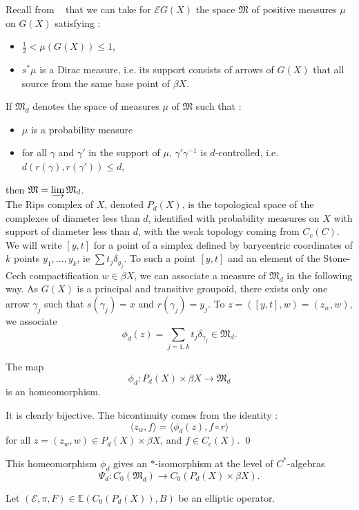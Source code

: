 Recall from ~\cite{TuNovikov} that we can take for $\mathcal E G(X) $ the space $\mathfrak M$ of positive measures $\mu$ on $G(X)$ satisfying :
\begin{itemize}
\item $\frac{1}{2}<\mu(G(X))\leq 1$, 
\item $s^*\mu$ is a Dirac measure, i.e. its support consists of arrows of $G(X)$ that all source from the same base point of $\beta X$.\\
\end{itemize}

If $\mathfrak M_d$ denotes the space of measures $\mu$ of $\mathfrak M$ such that :
\begin{itemize}
\item $\mu$ is a probability measure
\item for all $\gamma$ and $\gamma'$ in the support of $\mu$, $\gamma'\gamma^{-1}$ is $d$-controlled, i.e. $d(r(\gamma),r(\gamma'))\leq d$, 
\end{itemize}
then $\mathfrak M=\varinjlim \mathfrak M_d$.\\ %

The Rips complex of $X$, denoted $P_d(X)$, is the topological space of the complexes of diameter less than $d$, identified with probability measures on $X$ with support of diameter less than $d$, with the weak topology coming from $C_c(C)$. We will write $[y,t]$ for a point of a simplex defined by barycentric coordinates of $k$ points $y_1,...,y_k$, ie $\sum t_j \delta_{y_j}$. To such a point $[y,t]$ and an element of the Stone-Cech compactification $w\in \beta X$, we can associate a measure of $\mathfrak M_d$ in the following way. As $G(X)$ is a principal and transitive groupoid, there exists only one arrow $\gamma_j$ such that $s(\gamma_j)=x$ and $r(\gamma_j)=y_j$. To $z=([y,t],w)=(z_w,w)$, we associate 
\[\phi_d(z)=\sum_{j=1,k} t_j \delta_{\gamma_j}\in\mathfrak M_d.\]

\begin{prop}
The map
\[\phi_d: P_d(X)\times \beta X \rightarrow \mathfrak M_d\]
is an homeomorphism.
\end{prop}
\begin{dem}
It is clearly bijective. The bicontinuity comes from the identity :
\[\langle z_w,f\rangle=\langle \phi_d(z),f\circ r\rangle\]
for all $z=(z_w,w)\in P_d(X)\times \beta X$, and $f\in C_c(X)$.
\qed
\end{dem}

This homeomorphism $\phi_d$ gives an $*$-isomorphism at the level of $C^*$-algebras
\[\Psi_d : C_0(\mathfrak M_d)\rightarrow C_0(P_d(X)\times \beta X).\]

Let $(\mathcal E, \pi, F)\in \mathbb E(C_0(P_d(X)),B)$ be an elliptic operator. 
